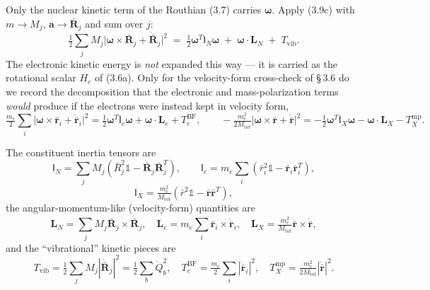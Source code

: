 Only the nuclear kinetic term of the Routhian (3.7) carries $\boldsymbol{\omega}$. Apply (3.9c) with $m\!\to\! M_j$, $\mathbf{a}\!\to\!\bar{\mathbf{R}}_j$ and sum over $j$:
\begin{equation}
\tfrac12\!\sum_j M_j\bigl|\boldsymbol{\omega}\!\times\!\bar{\mathbf{R}}_j+\dot{\bar{\mathbf{R}}}_j\bigr|^{2}
\;=\; \tfrac12\boldsymbol{\omega}^{T}\!\mathsf{I}_N\boldsymbol{\omega} \;+\; \boldsymbol{\omega}\!\cdot\!\mathbf{L}_N \;+\; T_{\mathrm{vib}}. \tag{3.9d}
\end{equation}
The electronic kinetic energy is \emph{not} expanded this way --- it is carried as the rotational scalar $H_e$ of (3.6a). Only for the velocity-form cross-check of \S\,3.6 do we record the decomposition that the electronic and mass-polarization terms \emph{would} produce if the electrons were instead kept in velocity form,
\begin{equation}
\tfrac{m_e}{2}\!\sum_i\bigl|\boldsymbol{\omega}\!\times\!\bar{\mathbf{r}}_i+\dot{\bar{\mathbf{r}}}_i\bigr|^{2}
= \tfrac12\boldsymbol{\omega}^{T}\!\mathsf{I}_e\boldsymbol{\omega} + \boldsymbol{\omega}\!\cdot\!\mathbf{L}_e + T_{e}^{\mathrm{BF}},\qquad
-\tfrac{m_e^{2}}{2M_{\mathrm{tot}}}\bigl|\boldsymbol{\omega}\!\times\!\bar{\mathbf{r}}+\dot{\bar{\mathbf{r}}}\bigr|^{2}
= -\tfrac12\boldsymbol{\omega}^{T}\!\mathsf{I}_X\boldsymbol{\omega} - \boldsymbol{\omega}\!\cdot\!\mathbf{L}_X - T_{X}^{\mathrm{mp}}. \tag{3.9e}
\end{equation}

The constituent inertia tensors are
\begin{equation}
\mathsf{I}_N=\sum_j M_j(\bar R_j^2\mathbb{1}-\bar{\mathbf{R}}_j\bar{\mathbf{R}}_j^T),\qquad \mathsf{I}_e=m_e\!\sum_i(\bar r_i^2\mathbb{1}-\bar{\mathbf{r}}_i\bar{\mathbf{r}}_i^T), \tag{3.9}
\end{equation}
\begin{equation}
\mathsf{I}_X=\tfrac{m_e^2}{M_{\mathrm{tot}}}(\bar r^2\mathbb{1}-\bar{\mathbf{r}}\bar{\mathbf{r}}^T), \tag{3.10}
\end{equation}
the angular-momentum-like (velocity-form) quantities are
\begin{equation}
\mathbf{L}_N=\sum_jM_j\bar{\mathbf{R}}_j\!\times\!\dot{\bar{\mathbf{R}}}_j,\quad \mathbf{L}_e=m_e\!\sum_i\bar{\mathbf{r}}_i\!\times\!\dot{\bar{\mathbf{r}}}_i,\quad \mathbf{L}_X=\tfrac{m_e^2}{M_{\mathrm{tot}}}\bar{\mathbf{r}}\!\times\!\dot{\bar{\mathbf{r}}}, \tag{3.11}
\end{equation}
and the ``vibrational'' kinetic pieces are
\begin{equation}
T_{\mathrm{vib}}=\tfrac12\!\sum_jM_j|\dot{\bar{\mathbf{R}}}_j|^2=\tfrac12\!\sum_b\dot Q_b^2,\quad T_{e}^{\mathrm{BF}}=\tfrac{m_e}{2}\!\sum_i|\dot{\bar{\mathbf{r}}}_i|^2,\quad T_X^{\mathrm{mp}}=\tfrac{m_e^2}{2M_{\mathrm{tot}}}|\dot{\bar{\mathbf{r}}}|^2. \tag{3.12}
\end{equation}

